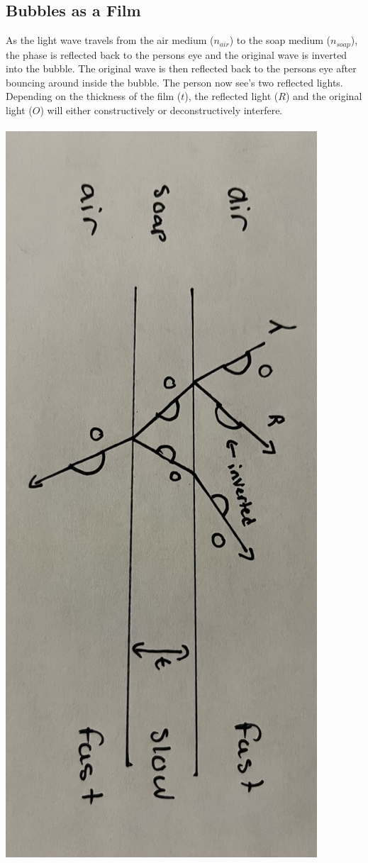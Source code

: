 \documentclass{article}
\begin{document}
\subsection{Bubbles as a Film}
As the light wave travels from the air medium ($n_{air}$) to the soap medium ($n_{soap}$), the phase is reflected back to the persons eye and the original wave is inverted into the bubble. The original wave is then reflected back to the persons eye after bouncing around inside the bubble. The person now see's two reflected lights. Depending on the thickness of the film ($t$), the reflected light ($R$) and the original light ($O$) will either constructively or deconstructively interfere.\\\\
\includegraphics[scale=0.05, angle=90, origin=c]{images/bubble_lens}
\end{document}
